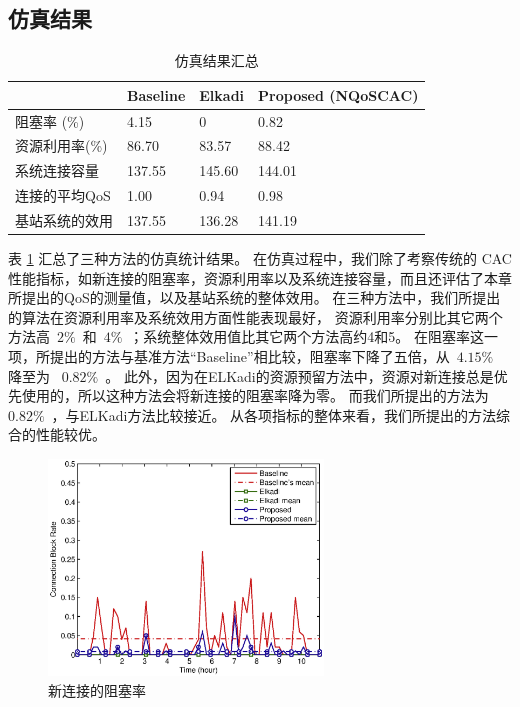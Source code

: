 \subsection{仿真结果}
%
\begin{table}[htbp]
\caption{仿真结果汇总} \label{tb:chap_cacop:res_sim}
\begin{center}
\wuhao
\begin{tabularx}{0.99\textwidth}{XXXX}
\toprule
&Baseline &Elkadi &Proposed (NQoSCAC)\\
\midrule
阻塞率 (\%) &4.15 & 0 &0.82\\
资源利用率(\%) &86.70 &83.57 &88.42\\
系统连接容量 &137.55 &145.60 &144.01\\
连接的平均QoS &1.00 &0.94 &0.98\\
基站系统的效用 &137.55 &136.28 &141.19\\
\bottomrule
\end{tabularx}
\end{center}
\end{table}
表 \ref{tb:chap_cacop:res_sim} 汇总了三种方法的仿真统计结果。
在仿真过程中，我们除了考察传统的 CAC 性能指标，如新连接的阻塞率，资源利用率以及系统连接容量，而且还评估了本章所提出的QoS的测量值，以及基站系统的整体效用。
在三种方法中，我们所提出的算法在资源利用率及系统效用方面性能表现最好，
资源利用率分别比其它两个方法高~$2\%$~和~$4\%$~；系统整体效用值比其它两个方法高约4和5。
在阻塞率这一项，所提出的方法与基准方法“Baseline”相比较，阻塞率下降了五倍，从~$4.15\%$~ 降至为 ~$0.82\%$~。
此外，因为在ELKadi的资源预留方法中，资源对新连接总是优先使用的，所以这种方法会将新连接的阻塞率降为零。
而我们所提出的方法为~$0.82\%$~，与ELKadi方法比较接近。
从各项指标的整体来看，我们所提出的方法综合的性能较优。
%
\begin{figure}[htbp]
\centering
\includegraphics[width=0.65\textwidth] {cacop_block_rate.eps}
\caption{新连接的阻塞率} \label{fig:chap_cacop:clock_accept_block_drop}
\end{figure}

